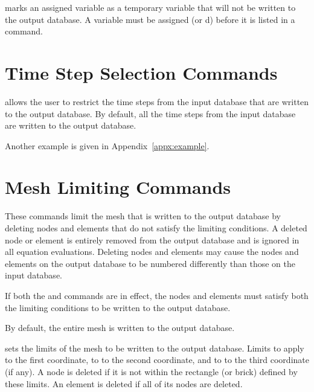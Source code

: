 \newpage %
 {
 marks an assigned variable as a temporary variable that
will not be written to the output database. A variable must be assigned
(or d) before it is listed in a  command.
}

\newpage
\section{Time Step Selection Commands} \label{cmd:timesel}

\caps{\PROGRAM} allows the user to restrict the time steps from the
input database that are written to the output database. By default, all
the time steps from the input database are written to the output
database.









Another example is given in Appendix~\ref{appx:example}.

\newpage
\section{Mesh Limiting Commands} \label{cmd:meshlimit}

These commands limit the mesh that is written to the output database by
deleting nodes and elements that do not satisfy the limiting conditions.
A deleted node or element is entirely removed from the output database
and is ignored in all equation evaluations. Deleting nodes and elements
may cause the nodes and elements on the output database to be numbered
differently than those on the input database.

If both the  and  commands are in effect, the
nodes and elements must satisfy both the limiting conditions to be
written to the output database.

By default, the entire mesh is written to the output database.

 {
 sets the limits of the mesh to be written to the output
database. Limits  to  apply to the first
coordinate,  to  to the second coordinate, and
 to  to the third coordinate (if any). A node is
deleted if it is not within the rectangle (or brick) defined by these
limits. An element is deleted if all of its nodes are deleted.
}

